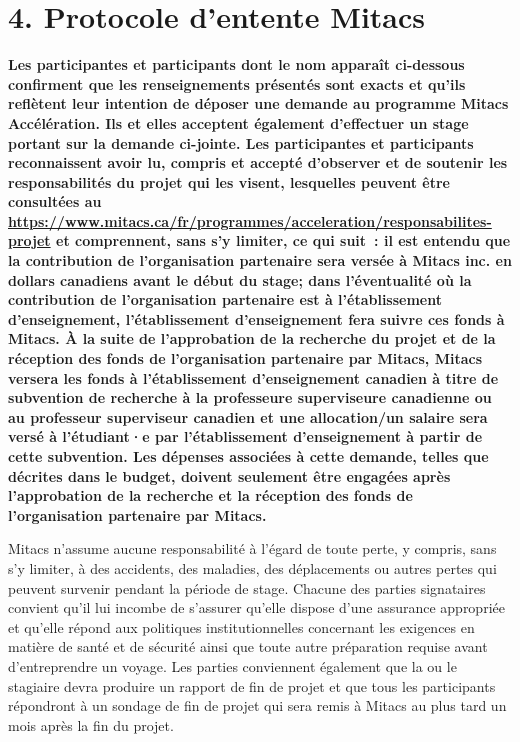 \newcommand{\addul}[1]{\underline{#1}}
\titleformat{\section}{\centering\Large\bfseries}{\thesection}{1em}{\addul}
\section*{4. Protocole d'entente Mitacs}
{
\bfseries
Les participantes et participants dont le nom apparaît ci-dessous confirment que les renseignements présentés sont exacts et qu'ils reflètent leur intention de déposer une demande au programme Mitacs Accélération. Ils et elles acceptent également d'effectuer un stage portant sur la demande ci-jointe. Les participantes et participants reconnaissent avoir lu, compris et accepté d'observer et de soutenir les responsabilités du projet qui les visent, lesquelles peuvent être consultées au \url{https://www.mitacs.ca/fr/programmes/acceleration/responsabilites-projet} et comprennent, sans s'y limiter, ce qui suit : il est entendu que la contribution de l'organisation partenaire sera versée à Mitacs inc. en dollars canadiens avant le début du stage; dans l'éventualité où la contribution de l'organisation partenaire est à l'établissement d'enseignement, l'établissement d'enseignement fera suivre ces fonds à Mitacs. À la suite de l'approbation de la recherche du projet et de la réception des fonds de l'organisation partenaire par Mitacs, Mitacs versera les fonds à l'établissement d'enseignement canadien à titre de subvention de recherche à la professeure superviseure canadienne ou au professeur superviseur canadien et une allocation/un salaire sera versé à l'étudiant·e par l'établissement d'enseignement à partir de cette subvention. Les dépenses associées à cette demande, telles que décrites dans le budget, doivent seulement être engagées après l'approbation de la recherche et la réception des fonds de l'organisation partenaire par Mitacs.

Mitacs n'assume aucune responsabilité à l'égard de toute perte, y compris, sans s'y limiter, à des accidents, des maladies, des déplacements ou autres pertes qui peuvent survenir pendant la période de stage. Chacune des parties signataires convient qu'il lui incombe de s'assurer qu'elle dispose d'une assurance appropriée et qu'elle répond aux politiques institutionnelles concernant les exigences en matière de santé et de sécurité ainsi que toute autre préparation requise avant d'entreprendre un voyage. Les parties conviennent également que la ou le stagiaire devra produire un rapport de fin de projet et que tous les participants répondront à un sondage de fin de projet qui sera remis à Mitacs au plus tard un mois après la fin du projet.

}
